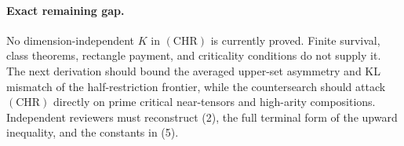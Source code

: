 \paragraph{Exact remaining gap.}
No dimension-independent $K$ in $(\mathrm{CHR})$ is currently proved.  Finite
survival, class theorems, rectangle payment, and criticality conditions do not
supply it.  The next derivation should bound the averaged upper-set asymmetry
and KL mismatch of the half-restriction frontier, while the countersearch
should attack $(\mathrm{CHR})$ directly on prime critical near-tensors and
high-arity compositions.  Independent reviewers must reconstruct (2), the
full terminal form of the upward inequality, and the constants in (5).


